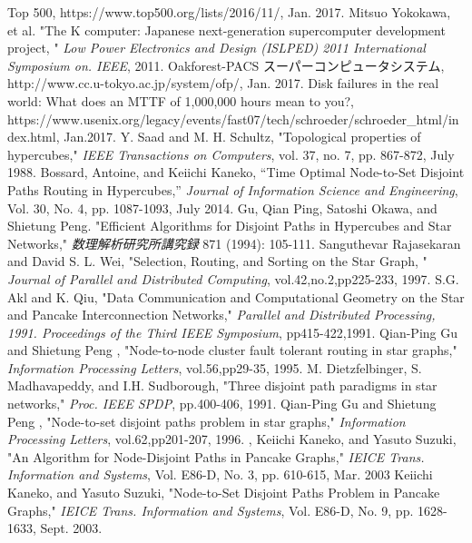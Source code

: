 \documentclass[specialreport]{subfiles}
\begin{document}
\begin{thebibliography}{9}
Top 500, https://www.top500.org/lists/2016/11/, Jan. 2017.
Mitsuo Yokokawa, et al. "The K computer: Japanese next-generation supercomputer development project, " {\it Low Power Electronics and Design (ISLPED) 2011 International Symposium on. IEEE}, 2011.
Oakforest-PACS スーパーコンピュータシステム, http://www.cc.u-tokyo.ac.jp/system/ofp/, Jan. 2017.
Disk failures in the real world: What does an MTTF of 1,000,000 hours mean to you?, https://www.usenix.org/legacy/events/fast07/tech/schroeder/schroeder\_html/index.html, Jan.2017.
 Y. Saad and M. H. Schultz, "Topological properties of hypercubes,"  {\it IEEE Transactions on Computers}, vol. 37, no. 7, pp. 867-872, July 1988. 
 Bossard, Antoine, and Keiichi Kaneko, “Time Optimal Node-to-Set Disjoint Paths Routing in Hypercubes,” {\it Journal of Information Science and Engineering}, Vol. 30, No. 4, pp. 1087-1093, July 2014.
 Gu, Qian Ping, Satoshi Okawa, and Shietung Peng. "Efficient Algorithms for Disjoint Paths in Hypercubes and Star Networks," {\it 数理解析研究所講究録} 871 (1994): 105-111. 
 Sanguthevar Rajasekaran and David S. L. Wei, "Selection, Routing, and Sorting on the Star Graph,	"  {\it Journal of Parallel and Distributed Computing}, {vol.42},{no.2},pp225-233, 1997.
S.G. Akl and K. Qiu, "Data Communication and Computational Geometry on the Star and Pancake Interconnection Networks," {\it Parallel and Distributed Processing, 1991. Proceedings of the Third IEEE Symposium}, pp415-422,1991.
 Qian-Ping Gu and Shietung Peng , "Node-to-node cluster fault tolerant routing in star graphs," {\it Information Processing Letters}, {vol.56},pp29-35, 1995.
 M. Dietzfelbinger, S. Madhavapeddy, and I.H. Sudborough, "Three disjoint path paradigms in star networks," {\it Proc. IEEE SPDP}, pp.400-406, 1991.
 Qian-Ping Gu and Shietung Peng , "Node-to-set disjoint paths problem in star graphs,"  {\it Information Processing Letters}, {vol.62},pp201-207, 1996.
 , Keiichi Kaneko, and Yasuto Suzuki, "An Algorithm for Node-Disjoint Paths in Pancake Graphs," {\it IEICE Trans. Information and Systems}, Vol. E86-D, No. 3, pp. 610-615, Mar. 2003
 Keiichi Kaneko, and Yasuto Suzuki, "Node-to-Set Disjoint Paths Problem in Pancake Graphs," {\it IEICE Trans. Information and Systems}, Vol. E86-D, No. 9, pp. 1628-1633, Sept. 2003.

\end{thebibliography}
\end{document}
